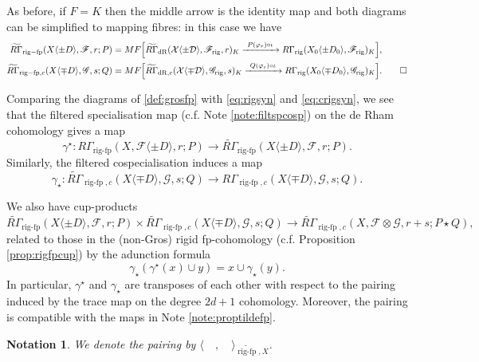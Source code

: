 \documentclass[cjm]{ipart}
\theoremstyle{plain}
\newtheorem{notation}[theorem]{Notation}
\theoremstyle{remark}
\DeclareMathOperator{\rigfp}{rig-fp}
\newcommand{\RGt}{\widetilde{R\Gamma}}
\newcommand{\cD}{\mathcal{D}}
\newcommand{\cX}{\mathcal{X}}
\newcommand{\dR}{\mathrm{dR}}
\newcommand{\rig}{\mathrm{rig}}
\newcommand{\sF}{\mathscr{F}}
\newcommand{\sG}{\mathscr{G}}
\numberwithin{equation}{subsection}
\begin{document}
  \begin{note}\label{note:proptildefp}
    As before, if $F = K$ then the middle arrow is the identity map and both diagrams can be simplified to mapping fibres: in this case we have
    \begin{align*}
     \RGt_{\rigfp}(X\langle \pm D\rangle,\sF,r;P) & = MF\Big[ \RGt_{\dR}(\cX\langle \pm \cD\rangle,\sF_{\rig},r)_K \xrightarrow{\  P(\varphi_r)\circ\iota \ } R\Gamma_{\rig}(X_0\langle \pm D_0\rangle,\sF_{\rig})_K\Big],\\
     \RGt_{\rigfp,c}(X\langle \mp D\rangle,\sG,s;Q) & = MF\Big[ \RGt_{\dR,c}(\cX\langle \mp \cD\rangle,\sG_{\rig},s)_K\xrightarrow{\ Q(\varphi_s) \circ \iota\ } R\Gamma_{\rig}(X_0\langle \mp D_0\rangle,\sG_{\rig})_K\Big].\qedhere
    \end{align*}
  \end{note}

  \begin{remark}
   \label{rem:Grosspcosp}
   Comparing the diagrams of \cref{def:grosfp} with \eqref{eq:rigsyn} and \eqref{eq:crigsyn}, we see that the filtered specialisation map (c.f. Note \ref{note:filtspcosp}) on the de Rham cohomology gives a map
   \[ \gamma^\star: R\Gamma_{\rigfp}(X,\sF\langle \pm D\rangle,r;P) \to \RGt_{\rigfp}(X\langle \pm D\rangle,\sF,r;P) .\]
   Similarly, the filtered cospecialisation induces a map
   \[ \gamma_\star: \RGt_{\rigfp,c}(X\langle \mp D\rangle,\sG,s; Q) \to R\Gamma_{\rigfp, c}(X\langle \mp D\rangle,\sG,s; Q). \]

   We also have cup-products
   \[ \RGt_{\rigfp}(X\langle \pm D\rangle,\sF,r;P) \times \RGt_{\rigfp,c}(X\langle \mp D\rangle,\sG,s; Q) \to \RGt_{\rigfp, c}(X,\sF\otimes\sG,r+s; P\star Q), \]
   related to those in the (non-Gros) rigid fp-cohomology (c.f. Proposition \ref{prop:rigfpcup}) by the adunction formula
   \[ \gamma_\star( \gamma^\star(x) \cup y) = x \cup \gamma_\star(y). \]
   In particular, $\gamma^\star$ and $\gamma_\star$ are transposes of each other with respect to the pairing induced by the trace map on the degree $2d+1$ cohomology. Moreover, the pairing is compatible with the maps in Note \ref{note:proptildefp}.
  \end{remark}

  \begin{notation}
   We denote the pairing by $\langle\quad,\quad\rangle_{\widetilde{\rigfp},X}$.
  \end{notation}

\end{document}

